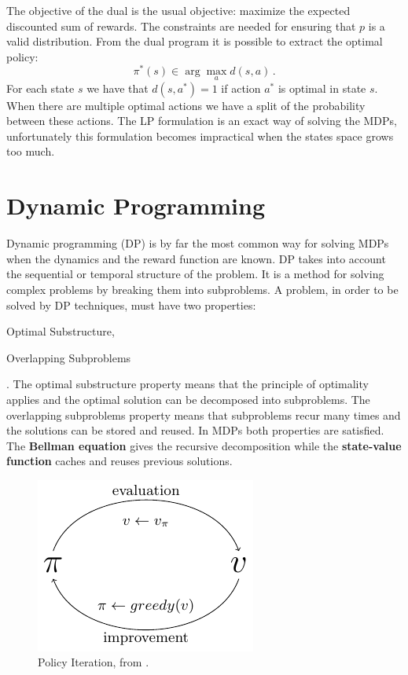 The objective of the dual is the usual objective: maximize the expected discounted sum of rewards.
The constraints are needed for ensuring that $p$ is a valid distribution. 
From the dual program it is possible to extract the optimal policy:
\begin{equation}
	\pi^*(s) \in \arg \max_a d(s,a)\, .
\end{equation}
For each state $s$ we have that $d(s,a^*) = 1$ if action $a^*$ is optimal in state $s$. When there are multiple optimal actions we have a split of the probability between these actions.
The LP formulation is an exact way of solving the MDPs, unfortunately this formulation becomes impractical when the states space grows too much.

\section{Dynamic Programming} \label{sec:dyn_prog}
Dynamic programming \citep{Bellman:1957} (DP) is by far the most common way for solving MDPs when the dynamics and the reward function are known. DP takes into account the sequential or temporal structure of the problem. It is a method for solving complex problems by breaking them into subproblems.
A problem, in order to be solved by DP techniques, must have two properties: \begin{enumerate*} \item Optimal Substructure, \item Overlapping Subproblems \end{enumerate*}. The optimal substructure property means that the principle of optimality applies and the optimal solution can be decomposed into subproblems. The overlapping subproblems property means that subproblems recur many times and the solutions can be stored and reused.
In MDPs both properties are satisfied. The \textbf{Bellman equation} gives the recursive decomposition while the \textbf{state-value function} caches and reuses previous solutions.

\begin{figure}[tb]
\centering
\includegraphics{pictures/value_iteration}
\caption{\small Policy Iteration, from \citep{sutton_introduction}.}
\end{figure}

